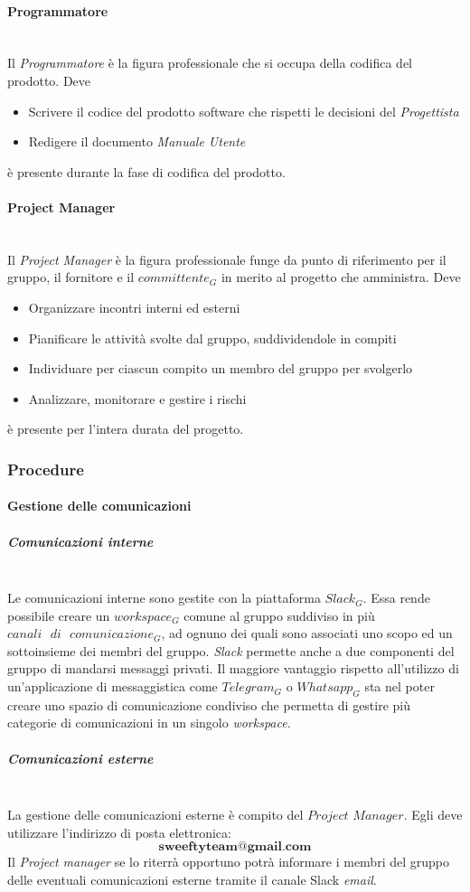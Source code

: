 		\paragraph{Programmatore} \mbox{} \\
		Il \emph{Programmatore} è la figura professionale che si occupa della codifica del prodotto. Deve
		\begin{itemize}
			\item Scrivere il codice  del prodotto software che rispetti le decisioni del \emph{Progettista}
			\item Redigere il documento \emph{Manuale Utente}
		\end{itemize}
		è presente durante la fase di codifica del prodotto.
		\paragraph{Project Manager} \mbox{} \\
		Il \emph{Project Manager} è la figura professionale funge da punto di riferimento per il gruppo, il fornitore e il $committente_G$ in merito al progetto che amministra. Deve
		\begin{itemize}
			\item Organizzare incontri interni ed esterni
			\item Pianificare le attività svolte dal gruppo, suddividendole in compiti
			\item Individuare per ciascun compito un membro del gruppo per svolgerlo
			\item Analizzare, monitorare e gestire i rischi
		\end{itemize}
		è presente per l'intera durata del progetto.
	\subsubsection{Procedure}
		\paragraph{Gestione delle comunicazioni}
			\subparagraph{Comunicazioni interne} \mbox{} \\
			\label{comInterne}
			Le comunicazioni interne sono gestite con la piattaforma $Slack_G$. Essa rende possibile creare un $workspace_G$ comune al gruppo suddiviso in più $canali \text{ } di \text{ } comunicazione_G$, ad ognuno dei quali sono associati uno scopo ed un sottoinsieme dei membri del gruppo. \emph{Slack} permette anche a due componenti del gruppo di mandarsi messaggi privati. Il maggiore vantaggio rispetto all'utilizzo di un'applicazione di messaggistica come $Telegram_G$ o $Whatsapp_G$ sta nel poter creare uno spazio di comunicazione condiviso che permetta di gestire più categorie di comunicazioni in un singolo \emph{workspace}. %
			\subparagraph{Comunicazioni esterne} \mbox{} \\
			 La gestione delle comunicazioni esterne è compito del $Project$ $Manager$. Egli deve utilizzare l'indirizzo di posta elettronica:
			$$\textbf{sweeftyteam@gmail.com}$$
			Il \emph{Project manager} se lo riterrà opportuno potrà informare i membri del gruppo delle eventuali comunicazioni esterne tramite il canale Slack \emph{email}.
			
